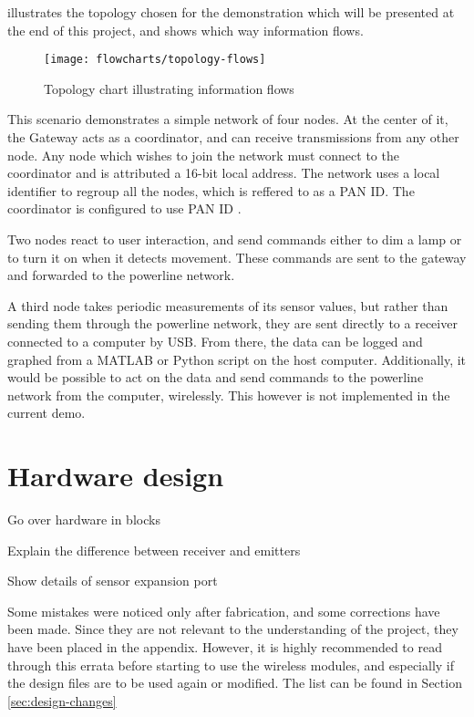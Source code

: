  illustrates the topology chosen for the demonstration
which will be presented at the end of this project, and shows which way
information flows. 

\begin{figure}[h]
  \begin{center}
    \texttt{[image: flowcharts/topology-flows]}
  \end{center}
  \caption{Topology chart illustrating information flows}
  \label{fig:topology-flows}
\end{figure}

This scenario demonstrates a simple network of four nodes. At the center of it,
the Gateway acts as a coordinator, and can receive transmissions from any other
node. Any node which wishes to join the network must connect to the coordinator
and is attributed a 16-bit local address. The network uses a local identifier to
regroup all the nodes, which is reffered to as a PAN ID. The coordinator is
configured to use PAN ID .

Two nodes react to user interaction, and send commands either to dim a lamp or
to turn it on when it detects movement. These commands are sent to the gateway
and forwarded to the powerline network.

A third node takes periodic measurements of its sensor values, but rather than
sending them through the powerline network, they are sent directly to a receiver
connected to a computer by USB. From there, the data can be logged and graphed
from a MATLAB or Python script on the host computer. Additionally, it would be
possible to act on the data and send commands to the powerline network from the
computer, wirelessly. This however is not implemented in the current demo.


\section{Hardware design}

Go over hardware in blocks

Explain the difference between receiver and emitters

Show details of sensor expansion port


Some mistakes were noticed only after fabrication, and some corrections have
been made. Since they are not relevant to the understanding of the project, they
have been placed in the appendix. However, it is highly recommended to read
through this errata before starting to use the wireless modules, and especially
if the design files are to be used again or modified. The list can be found in
Section \ref{sec:design-changes}

